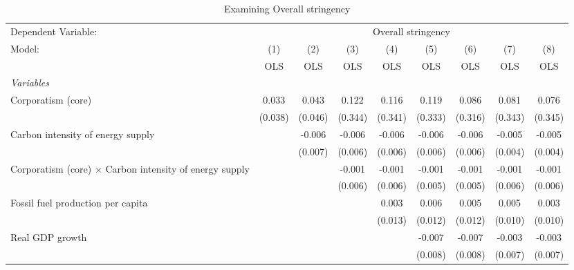 
\begin{table}[htbp]
   \caption{Examining Overall stringency}
   \centering
   \begin{tabular}{lcccccccc}
      \toprule
      Dependent Variable: & \multicolumn{8}{c}{Overall stringency}\\
      Model:                                                         & (1)     & (2)     & (3)     & (4)     & (5)     & (6)     & (7)     & (8)\\  
                                                                     &  OLS    & OLS     & OLS     & OLS     & OLS     & OLS     & OLS     & OLS\\  
      \midrule
      \emph{Variables}\\
      Corporatism (core)                                             & 0.033   & 0.043   & 0.122   & 0.116   & 0.119   & 0.086   & 0.081   & 0.076\\   
                                                                     & (0.038) & (0.046) & (0.344) & (0.341) & (0.333) & (0.316) & (0.343) & (0.345)\\   
      Carbon intensity of energy supply                              &         & -0.006  & -0.006  & -0.006  & -0.006  & -0.006  & -0.005  & -0.005\\   
                                                                     &         & (0.007) & (0.006) & (0.006) & (0.006) & (0.006) & (0.004) & (0.004)\\   
      Corporatism (core) $\times$ Carbon intensity of energy supply  &         &         & -0.001  & -0.001  & -0.001  & -0.001  & -0.001  & -0.001\\   
                                                                     &         &         & (0.006) & (0.006) & (0.005) & (0.005) & (0.006) & (0.006)\\   
      Fossil fuel production per capita                              &         &         &         & 0.003   & 0.006   & 0.005   & 0.005   & 0.003\\   
                                                                     &         &         &         & (0.013) & (0.012) & (0.012) & (0.010) & (0.010)\\   
      Real GDP growth                                                &         &         &         &         & -0.007  & -0.007  & -0.003  & -0.003\\   
                                                                     &         &         &         &         & (0.008) & (0.008) & (0.007) & (0.007)\\   

\end{tabular}
\end{table}
